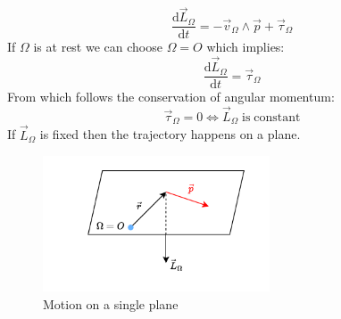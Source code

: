 \begin{itemize}
\begin{equation}
    \end{equation}
    \begin{equation}
        \dfrac{\mathrm{d}\vec{L}_{\Omega}}{\mathrm{d}t} = - \vec{v}_{\Omega}\wedge\vec{p} + \vec{\tau}_{\Omega}
    \end{equation}
    If $\Omega$ is at rest we can choose $\Omega = O$ which implies:
    \begin{equation}
        \dfrac{\mathrm{d}\vec{L}_{\Omega}}{\mathrm{d}t} = \vec{\tau}_{\Omega}
    \end{equation}
    From which follows the conservation of angular momentum:
    \begin{equation}
        \vec{\tau}_{\Omega} = 0 \iff\vec{L}_{\Omega}\;\mathrm{is\;constant}
    \end{equation}
    If $\vec{L}_{\Omega}$ is fixed then the trajectory happens on a plane.
    \begin{figure}[H]
        \centering
        \includegraphics[width=0.6\textwidth]{res/svg/singleplanemotion.drawio}
        \caption{Motion on a single plane}
        \label{fig:image3}
    \end{figure}
\end{itemize}
